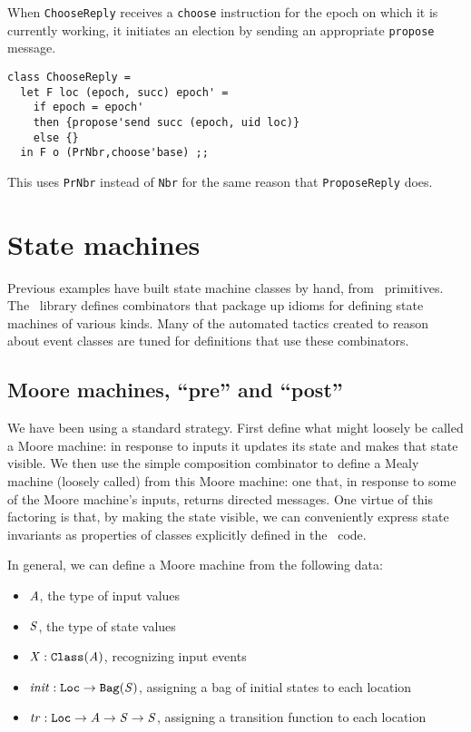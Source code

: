 \documentclass[final]{article}
\begin{document}

When \lstinline{ChooseReply} receives a \lstinline{choose}
instruction for the epoch on which it is currently working, it
initiates an election by sending an appropriate
\lstinline{propose}
message.
\begin{emlcode}
\begin{lstlisting}
class ChooseReply =
  let F loc (epoch, succ) epoch' =
    if epoch = epoch'
    then {propose'send succ (epoch, uid loc)}
    else {}
  in F o (PrNbr,choose'base) ;;
\end{lstlisting}
\end{emlcode}
This uses \lstinline{PrNbr} instead of \lstinline{Nbr} for the same
reason that \lstinline{ProposeReply} does.

\section{State machines}
\label{sec:state-machine}

Previous examples have built state machine classes by hand, from
\eml\ primitives.  The \nuprl\ library defines combinators that
package up idioms for defining state machines of various kinds.  Many
of the automated tactics created to reason about event classes are
tuned for definitions that use these combinators.

\subsection{Moore machines, ``pre'' and
  ``post''}\label{sec:SM1-Memory1}

We have been using a standard strategy.  First define what might
loosely be called a Moore machine: in response to inputs it updates
its state and makes that state visible.  We then use the simple
composition combinator to define a Mealy machine (loosely called) from
this Moore machine: one that, in response to some of the Moore
machine's inputs, returns directed messages.  One virtue of this
factoring is that, by making the state visible, we can conveniently
express state invariants as properties of classes explicitly defined
in the \eml\ code.

In general, we can define a Moore machine from the following data:
\begin{itemize}
\item $\mathit{A}$, the type of input values
\item $\mathit{S}$, the type of state values
\item $\mathit{X}:\mathtt{Class}(\mathit{A})$, recognizing input events
\item $\mathit{init} : \mathtt{Loc}\rightarrow\mathtt{Bag}(\mathit{S})$,
  assigning a bag of initial states to each location
\item
  $\mathit{tr} : \mathtt{Loc}\rightarrow\mathit{A}\rightarrow\mathit{S}\rightarrow\mathit{S}$,
  assigning a transition function to each location
\end{itemize}
\end{document}
